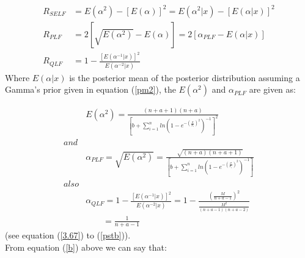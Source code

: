\documentclass[a4paper,12pt]{report}
\begin{document}
\begin{equation}\label{prg}
\begin{split}
R_{SELF}&=E(\alpha^2)-\left[E(\alpha)\right]^2=E(\alpha^2|x)-\left[E(\alpha|x)\right]^2\\
R_{PLF} &= 2\left[ {\sqrt {E\left( {{\alpha ^2}} \right)}  - E\left( \alpha  \right)} \right] = 2\left[ {{\alpha _{PLF}} - E\left( {\alpha |x} \right)} \right]\\
R_{QLF} &= 1-\frac{[E(\alpha^{-1}|x)]^2}{E(\alpha^{-2}|x)}
\end{split}
\end{equation}
Where $E(\alpha|x)$ is  the posterior mean of the posterior distribution assuming a Gamma's prior given in equation (\ref{pm2}), the $E(\alpha^2)$ and $\alpha _{PLF}$ are given as:

\begin{equation}\label{b}
\begin{split}
&E(\alpha^2)=\frac{(n+a+1)(n+a)}{\left[b+\sum\limits_{ i=1 }^{n}ln\left(1-e^{-\left(\frac{\sigma}{x_i}\right)^2}\right)^{-1}\right]^2}\\
and&\\
&\alpha _{PLF}=\sqrt {E\left( {{\alpha ^2}} \right)}=\frac{\sqrt{(n+a)(n+a+1)}}{\left[b+\sum\limits_{ i=1 }^{n}ln\left(1-e^{-\left(\frac{\sigma}{x_i}\right)^2}\right)^{-1}\right]}\\
also&\\
&\alpha_{QLF}=1-\frac{[E(\alpha^{-1}|x)]^2}{E(\alpha^{-2}|x)}=1-\frac{\left(\frac{M}{n+a-1}\right)^2}{\frac{M^2}{(n+a-1)(n+a-2)}}\\
&\qquad=\frac{1}{n+a-1}
\end{split}
\end{equation}
(see equation (\ref{3.67}) to (\ref{pstb})).\\
From equation (\ref{b}) above we can say that:
\end{document}
